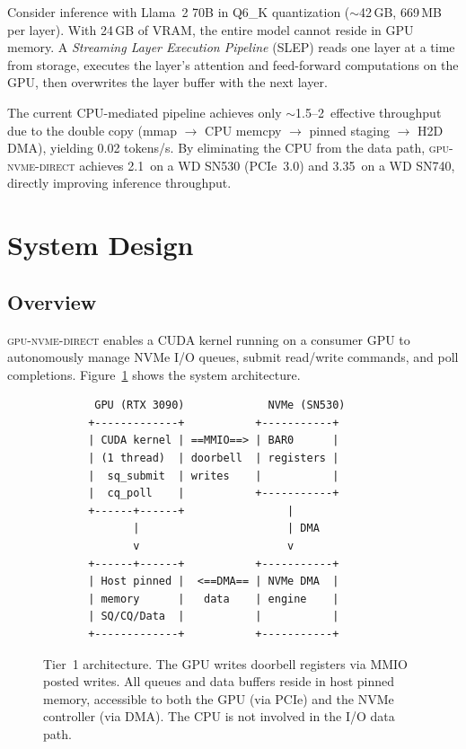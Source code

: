 \documentclass{article}
\newcommand{\sysname}{\textsc{gpu-nvme-direct}}
\newcommand{\GBs}{\,\text{GB/s}}
\begin{document}
Consider inference with Llama~2 70B in Q6\_K quantization ($\sim$42\,GB,
669\,MB per layer). With 24\,GB of VRAM, the entire model cannot reside in GPU
memory. A \emph{Streaming Layer Execution Pipeline} (SLEP) reads one layer at a
time from storage, executes the layer's attention and feed-forward computations
on the GPU, then overwrites the layer buffer with the next layer.

The current CPU-mediated pipeline achieves only $\sim$1.5--2\GBs{} effective
throughput due to the double copy (mmap $\rightarrow$ CPU memcpy $\rightarrow$
pinned staging $\rightarrow$ H2D DMA), yielding 0.02 tokens/s. By eliminating
the CPU from the data path, \sysname{} achieves 2.1\GBs{} on a WD SN530
(PCIe~3.0) and 3.35\GBs{} on a WD SN740, directly improving inference
throughput.

\section{System Design}
\label{sec:design}

\subsection{Overview}

\sysname{} enables a CUDA kernel running on a consumer GPU to autonomously
manage NVMe I/O queues, submit read/write commands, and poll completions.
Figure~\ref{fig:architecture} shows the system architecture.

\begin{figure}[t]
\centering
\small
\begin{verbatim}
        GPU (RTX 3090)             NVMe (SN530)
       +-------------+           +-----------+
       | CUDA kernel | ==MMIO==> | BAR0      |
       | (1 thread)  | doorbell  | registers |
       |  sq_submit  | writes    |           |
       |  cq_poll    |           +-----------+
       +------+------+                |
              |                       | DMA
              v                       v
       +------+------+           +-----------+
       | Host pinned |  <==DMA== | NVMe DMA  |
       | memory      |   data    | engine    |
       | SQ/CQ/Data  |           |           |
       +-------------+           +-----------+
\end{verbatim}
\caption{Tier~1 architecture. The GPU writes doorbell registers via MMIO
  posted writes. All queues and data buffers reside in host pinned memory,
  accessible to both the GPU (via PCIe) and the NVMe controller (via DMA).
  The CPU is not involved in the I/O data path.}
\label{fig:architecture}
\end{figure}
\end{document}

